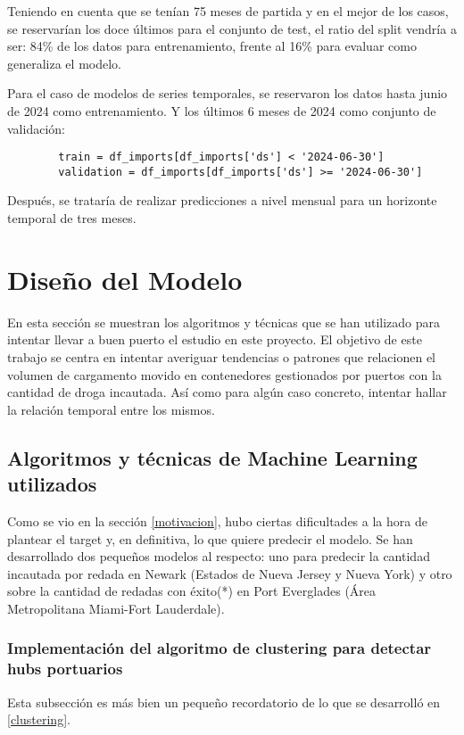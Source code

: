 \documentclass[12pt]{article}
\begin{document}
	Teniendo en cuenta que se tenían 75 meses de partida y en el mejor de los casos, se reservarían los doce últimos para el conjunto de test, el ratio del split vendría a ser: 84\% de los datos para entrenamiento, frente al 16\% para evaluar como generaliza el modelo.
	
	
	Para el caso de modelos de series temporales, se reservaron los datos hasta junio de 2024 como entrenamiento. Y los últimos 6 meses de 2024 como conjunto de validación:
	
	\begin{verbatim}
		train = df_imports[df_imports['ds'] < '2024-06-30']
		validation = df_imports[df_imports['ds'] >= '2024-06-30']
	\end{verbatim}

	Después, se trataría de realizar predicciones a nivel mensual para un horizonte temporal de tres meses.


\newpage
\section{\label{Diseño}Diseño del Modelo}
En esta sección se muestran los algoritmos y técnicas que se han utilizado para intentar llevar a buen puerto el estudio en este proyecto. El objetivo de este trabajo se centra en intentar averiguar tendencias o patrones que relacionen el volumen de cargamento movido en contenedores gestionados por puertos con la cantidad de droga incautada. Así como para algún caso concreto, intentar hallar la relación temporal entre los mismos.

	\subsection{Algoritmos y técnicas de Machine Learning utilizados}

	
	Como se vio en la sección \ref{motivacion}, hubo ciertas dificultades a la hora de plantear el target y, en definitiva, lo que quiere predecir el modelo. Se han desarrollado dos pequeños modelos al respecto: uno para predecir la cantidad incautada por redada en Newark (Estados de Nueva Jersey y Nueva York) y otro sobre la cantidad de redadas con éxito(*) en Port Everglades (Área Metropolitana Miami-Fort Lauderdale).
	
	\subsubsection{Implementación del algoritmo de clustering para detectar hubs portuarios}
	Esta subsección es más bien un pequeño recordatorio de lo que se desarrolló en \ref{clustering}.
	
\end{document}

